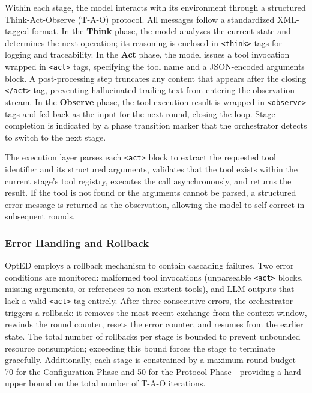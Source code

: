 Within each stage, the model interacts with its environment through a structured Think-Act-Observe (T-A-O) protocol. All messages follow a standardized XML-tagged format. In the \textbf{Think} phase, the model analyzes the current state and determines the next operation; its reasoning is enclosed in \texttt{<think>} tags for logging and traceability. In the \textbf{Act} phase, the model issues a tool invocation wrapped in \texttt{<act>} tags, specifying the tool name and a JSON-encoded arguments block. A post-processing step truncates any content that appears after the closing \texttt{</act>} tag, preventing hallucinated trailing text from entering the observation stream. In the \textbf{Observe} phase, the tool execution result is wrapped in \texttt{<observe>} tags and fed back as the input for the next round, closing the loop. Stage completion is indicated by a phase transition marker that the orchestrator detects to switch to the next stage.

The execution layer parses each \texttt{<act>} block to extract the requested tool identifier and its structured arguments, validates that the tool exists within the current stage's tool registry, executes the call asynchronously, and returns the result. If the tool is not found or the arguments cannot be parsed, a structured error message is returned as the observation, allowing the model to self-correct in subsequent rounds.

\subsubsection{Error Handling and Rollback}

OptED employs a rollback mechanism to contain cascading failures. Two error conditions are monitored: malformed tool invocations (unparseable \texttt{<act>} blocks, missing arguments, or references to non-existent tools), and LLM outputs that lack a valid \texttt{<act>} tag entirely. After three consecutive errors, the orchestrator triggers a rollback: it removes the most recent exchange from the context window, rewinds the round counter, resets the error counter, and resumes from the earlier state. The total number of rollbacks per stage is bounded to prevent unbounded resource consumption; exceeding this bound forces the stage to terminate gracefully. Additionally, each stage is constrained by a maximum round budget---70 for the Configuration Phase and 50 for the Protocol Phase---providing a hard upper bound on the total number of T-A-O iterations.

